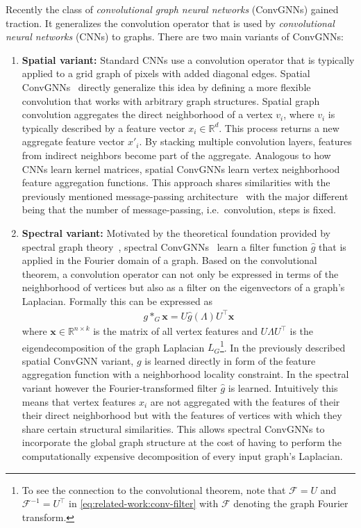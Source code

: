 \documentclass[12pt]{scrartcl}
\begin{document}
\begin{enumerate}[label=\textbf{\arabic*.}]
		Recently the class of \textit{convolutional graph neural networks} (ConvGNNs) gained traction.
		It generalizes the convolution operator that is used by \textit{convolutional neural networks} (CNNs) to graphs.
		There are two main variants of ConvGNNs:
		\begin{enumerate}[label=\textbf{\alph*)}] %
			\item \textbf{Spatial variant:}
				Standard CNNs use a convolution operator that is typically applied to a grid graph of pixels with added diagonal edges.
				Spatial ConvGNNs~\cite{Micheli2009} directly generalize this idea by defining a more flexible convolution that works with arbitrary graph structures.
				Spatial graph convolution aggregates the direct neighborhood of a vertex $v_i$, where $v_i$ is typically described by a feature vector $x_i \in \mathbb{R}^d$.
				This process returns a new aggregate feature vector $x'_i$.
				By stacking multiple convolution layers, features from indirect neighbors become part of the aggregate.
				Analogous to how CNNs learn kernel matrices, spatial ConvGNNs learn vertex neighborhood feature aggregation functions.
				This approach shares similarities with the previously mentioned message-passing architecture~\cite{Gori2005} with the major different being that the number of message-passing, i.e.\ convolution, steps is fixed.
			\item \textbf{Spectral variant:}
				Motivated by the theoretical foundation provided by spectral graph theory~\cite{Shuman2013}, spectral ConvGNNs~\cite{Bruna2013} learn a filter function $\hat{g}$ that is applied in the Fourier domain of a graph.
				Based on the convolutional theorem, a convolution operator can not only be expressed in terms of the neighborhood of vertices but also as a filter on the eigenvectors of a graph's Laplacian.
				Formally this can be expressed as
				\begin{align}
					g *_G \bm{x} = U \hat{g}(\Lambda) U^{\top} \bm{x}\label{eq:related-work:conv-filter}
				\end{align}
				where $\bm{x} \in \mathbb{R}^{n \times k}$ is the matrix of all vertex features and $U \Lambda U^{\top}$ is the eigendecomposition of the graph Laplacian $L_G$\footnote{
					To see the connection to the convolutional theorem, note that $\mathcal{F} = U$ and $\mathcal{F}^{-1} = U^{\top}$ in \cref{eq:related-work:conv-filter} with $\mathcal{F}$ denoting the graph Fourier transform.
				}.
				In the previously described spatial ConvGNN variant, $g$ is learned directly in form of the feature aggregation function with a neighborhood locality constraint.
				In the spectral variant however the Fourier-transformed filter $\hat{g}$ is learned.
				Intuitively this means that vertex features $x_i$ are not aggregated with the features of their their direct neighborhood but with the features of vertices with which they share certain structural similarities.
				This allows spectral ConvGNNs to incorporate the global graph structure at the cost of having to perform the computationally expensive decomposition of every input graph's Laplacian.


\end{enumerate}
\end{enumerate}
\end{document}
